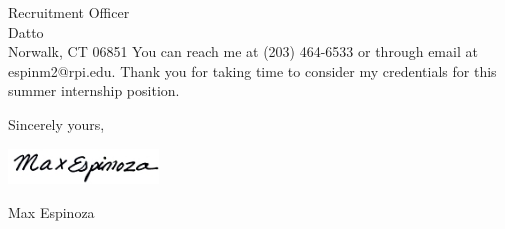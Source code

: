 \documentclass[11pt]{letter} %
\begin{document}
\begin{letter}{
Recruitment Officer\\
Datto\\
Norwalk, CT 06851}
You can reach me at (203) 464-6533 or through email at espinm2@rpi.edu. Thank you for taking time to consider my credentials for this summer internship position.


Sincerely yours,

\includegraphics[width=4cm]{../signature.png}

Max Espinoza



\end{letter}
\end{document}
